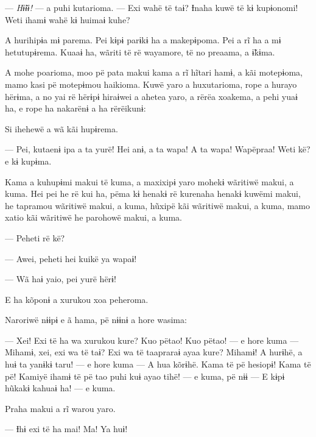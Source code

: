 --- \textit{Hɨ̃ɨɨ!} --- a puhi kutarioma. --- Exi wahë të taɨ? Ɨnaha kuwë të kɨ
kupɨonomi! Weti ihamɨ wahë kɨ huimaɨ kuhe?


A hurihipɨa mɨ parema. Pei kɨpɨ parɨkɨ ha a makepɨpoma. Pei a rĩ ha a mɨ
hetutupɨrema. Kuaaɨ ha, wãriti të rë wayamore, të no preaama, a ɨ̃kɨma. 

A mohe poarioma, moo pë pata makui kama a rĩ hĩtari hamɨ, a kãi
motepɨoma, mamo kasi pë motepɨmou haikioma. Kuwë yaro a huxutarioma,
rope a hurayo hërɨma, a no yai rë hërɨpɨ hiraɨwei a ahetea yaro, a rërëa
xoakema, a pehi yuaɨ ha, e rope ha nakarënɨ a ha rërëikunɨ:


Si ihehewë a wã kãi hupɨrema. 

--- Pei, kutaenɨ ipa a ta yurë! Hei anɨ, a ta wapa! A ta wapa! Wapëpraa!
Weti kë? e kɨ kupɨma.


Kama a kuhupɨmi makui të kuma, a maxixipɨ yaro mohekɨ wãritiwë makui, a
kuma. Hei pei he rë kui ha, pëma kɨ henakɨ rë kurenaha henakɨ kuwëmi
makui, he tapramou wãritiwë makui, a kuma, hũxipë kãi wãritiwë makui, a
kuma, mamo xatio kãi wãritiwë he parohowë makui, a kuma. 

--- Peheti rë kë?

--- Awei, peheti hei kuikë ya wapaɨ! 

--- Wã haɨ yaio, pei yurë hërɨ! 

E ha kõponɨ a xurukou xoa peheroma. 

Naroriwë nɨɨpɨ e ã hama, pë nɨɨnɨ a hore wasima: 

--- Xei! Exi të ha wa xurukou kure? Kuo pëtao! Kuo pëtao! --- e hore
kuma --- Mihamɨ, xei, exi wa të taɨ? Exi wa të taapraraɨ ayaa kure?
Mihamɨ! A hurɨhë, a huɨ ta yanɨkɨ taru! --- e hore kuma --- A hua
kõrɨhë. Kama të pë hesiopɨ! Kama të pë! Kamiyë ihamɨ të pë tao puhi kuɨ
ayao tihë! --- e kuma, pë nɨɨ --- E kɨpɨ hũkakɨ kahuaɨ ha! --- e kuma. 

Praha makui a rĩ warou yaro. 

--- Ɨhɨ exi të ha mai! Ma! Ya huɨ! 

